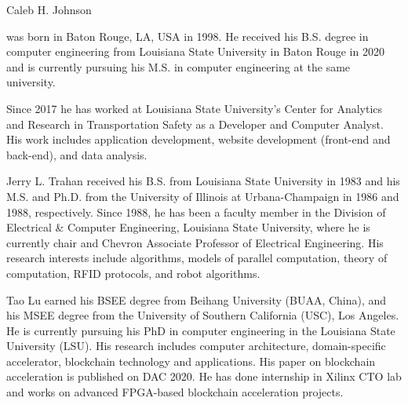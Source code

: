 \documentclass{ieeeaccess}
\begin{document}
\begin{IEEEbiography}{Caleb H. Johnson} 

was born in Baton Rouge, LA, USA in 1998. He received his B.S. degree in computer engineering
from Louisiana State University in Baton Rouge in 2020 and is currently pursuing his M.S. in
computer engineering at the same university.

Since 2017 he has worked at Louisiana State University's Center for Analytics and Research in
Transportation Safety as a Developer and Computer Analyst. His work includes application
development, website development (front-end and back-end), and data analysis. 
\end{IEEEbiography}
\begin{IEEEbiography}{Jerry L. Trahan}
received his B.S. from Louisiana State University in 1983 and his M.S. and Ph.D. from the
University of Illinois at Urbana-Champaign in 1986 and 1988, respectively.  Since 1988, he has
been a faculty member in the Division of Electrical \& Computer Engineering, Louisiana State
University, where he is currently chair and Chevron Associate Professor of Electrical
Engineering. His research interests include algorithms, models of parallel computation, theory
of computation, RFID protocols, and robot algorithms.
\end{IEEEbiography}
\begin{IEEEbiography}{Tao Lu} 
earned his BSEE degree from Beihang University (BUAA, China), and his MSEE degree from the
University of Southern California (USC), Los Angeles. He is currently pursuing his PhD in
computer engineering in the Louisiana State University (LSU). His research includes computer
architecture, domain-specific accelerator, blockchain technology and applications. His paper
on blockchain acceleration is published on DAC 2020. He has done internship in Xilinx CTO lab
and works on advanced FPGA-based blockchain acceleration projects. 
\end{IEEEbiography}
\end{document}
